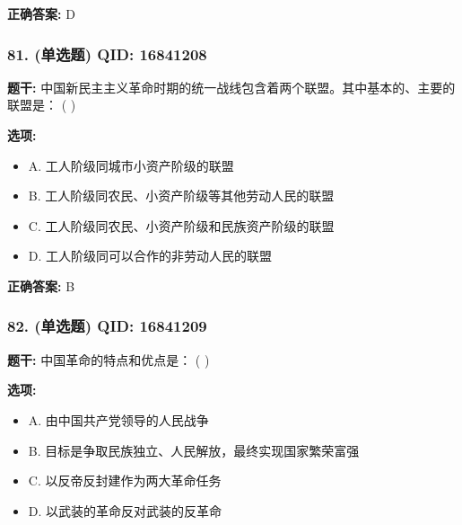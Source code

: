 \documentclass[12pt,UTF8]{ctexart}
\begin{document}
\textbf{正确答案:}
D

\vspace{0.3em}\hrulefill\vspace{0.7em}

\subsubsection*{81. (单选题) \small QID: 16841208}

\textbf{题干:}
中国新民主主义革命时期的统一战线包含着两个联盟。其中基本的、主要的联盟是： ( )

\textbf{选项:}
\begin{itemize}[leftmargin=*]

  \item A. 工人阶级同城市小资产阶级的联盟

  \item B. 工人阶级同农民、小资产阶级等其他劳动人民的联盟

  \item C. 工人阶级同农民、小资产阶级和民族资产阶级的联盟

  \item D. 工人阶级同可以合作的非劳动人民的联盟

\end{itemize}

\textbf{正确答案:}
B

\vspace{0.3em}\hrulefill\vspace{0.7em}

\subsubsection*{82. (单选题) \small QID: 16841209}

\textbf{题干:}
中国革命的特点和优点是： ( )

\textbf{选项:}
\begin{itemize}[leftmargin=*]

  \item A. 由中国共产党领导的人民战争

  \item B. 目标是争取民族独立、人民解放，最终实现国家繁荣富强

  \item C. 以反帝反封建作为两大革命任务

  \item D. 以武装的革命反对武装的反革命

\end{itemize}
\end{document}
